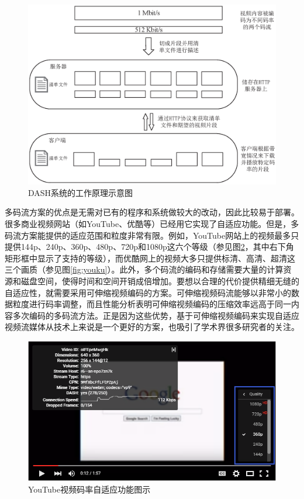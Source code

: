 \begin{figure}[t]
	\centering
	\vspace{10pt}
	\includegraphics[width = 1.0\linewidth]{eps/DASH}
	\caption{DASH系统的工作原理示意图\label{fig:DASH}}
\end{figure}

多码流方案的优点是无需对已有的程序和系统做较大的改动，因此比较易于部署\supercite{Bouten2014}。很多商业视频网站（如YouTube、优酷等）已经用它实现了自适应功能。但是，多码流方案能提供的适应范围和粒度非常有限。例如，YouTube网站上的视频最多只提供144p、240p、360p、480p、720p和1080p这六个等级（参见图\ref{fig:youtube}，其中右下角矩形框中显示了支持的等级），而优酷网上的视频大多只提供标清、高清、超清这三个画质（参见图\ref{fig:youku}）。此外，多个码流的编码和存储需要大量的计算资源和磁盘空间，使得时间和空间开销成倍增加。要想以合理的代价提供精细无缝的自适应性，就需要采用可伸缩视频编码的方案。可伸缩视频码流能够以非常小的数据粒度进行码率调整，而且性能分析表明可伸缩视频编码的压缩效率远高于同一内容多次编码的多码流方法\supercite{SVC-Performance}。正是因为这些优势，基于可伸缩视频编码来实现自适应视频流媒体从技术上来说是一个更好的方案，也吸引了学术界很多研究者的关注\supercite{Chuah2012, Zhu2013, Dan2013, Yang2014, Cicalo2014}。

\begin{figure}[t]
	\centering
	\vspace{10pt}
	\includegraphics[width = 1.0\linewidth]{figures/youtube.png}
	\vspace{10pt}
	\caption{YouTube视频码率自适应功能图示\label{fig:youtube}}
	\vspace{10pt}
\end{figure}

